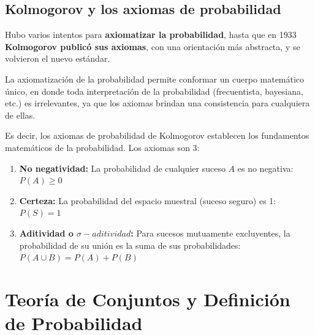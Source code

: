 \documentclass[
  letterpaper,
  DIV=11,
  numbers=noendperiod]{scrreprt}
\begin{document}
\section{Kolmogorov y los axiomas de
probabilidad}\label{kolmogorov-y-los-axiomas-de-probabilidad}

Hubo varios intentos para \textbf{axiomatizar la probabilidad}, hasta
que en 1933 \textbf{Kolmogorov publicó sus axiomas}, con una orientación
más abstracta, y se volvieron el nuevo estándar.

La axiomatización de la probabilidad permite conformar un cuerpo
matemático único, en donde toda interpretación de la probabilidad
(frecuentista, bayesiana, etc.) es irrelevantes, ya que los axiomas
brindan una consistencia para cualquiera de ellas.

Es decir, los axiomas de probabilidad de Kolmogorov establecen los
fundamentos matemáticos de la probabilidad. Los axiomas son 3:

\begin{tcolorbox}[enhanced jigsaw, arc=.35mm, bottomrule=.15mm, bottomtitle=1mm, breakable, colback=white, colbacktitle=quarto-callout-important-color!10!white, colframe=quarto-callout-important-color-frame, coltitle=black, left=2mm, leftrule=.75mm, opacityback=0, opacitybacktitle=0.6, rightrule=.15mm, title=\textcolor{quarto-callout-important-color}{\faExclamation}\hspace{0.5em}{Axiomas de Probabilidad de Kolmogorov Smirnov (1933)}, titlerule=0mm, toprule=.15mm, toptitle=1mm]

\begin{enumerate}
\def\labelenumi{\arabic{enumi}.}
\item
  \textbf{No negatividad:} La probabilidad de cualquier suceso \(A\) es
  no negativa: \(P(A) \geq 0\)
\item
  \textbf{Certeza:} La probabilidad del espacio muestral (suceso seguro)
  es 1: \(P(S) = 1\)
\item
  \textbf{Aditividad o \(\sigma-aditividad\):} Para sucesos mutuamente
  excluyentes, la probabilidad de su unión es la suma de sus
  probabilidades: \(P(A \cup B) = P(A) + P(B)\)\\
\end{enumerate}

\end{tcolorbox}


\chapter{Teoría de Conjuntos y Definición de
Probabilidad}\label{teoruxeda-de-conjuntos-y-definiciuxf3n-de-probabilidad}
\end{document}
